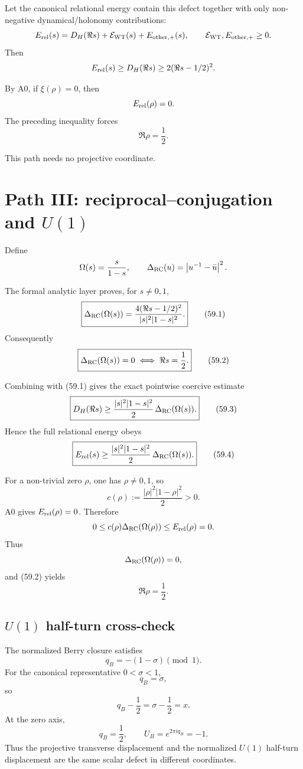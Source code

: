 Let the canonical relational energy contain this defect together with only
non-negative dynamical/holonomy contributions:
\[
E_{\rm rel}(s)
=
D_H(\Re s)
+
\mathcal E_{\rm WT}(s)
+
E_{\rm other,+}(s),
\qquad
\mathcal E_{\rm WT},E_{\rm other,+}\ge0.
\]
Then
\[
E_{\rm rel}(s)\ge D_H(\Re s)\ge2(\Re s-1/2)^2.
\]

By A0, if \(\xi(\rho)=0\), then
\[
E_{\rm rel}(\rho)=0.
\]
The preceding inequality forces
\[
\boxed{\Re\rho=\frac12.}
\]

This path needs no projective coordinate.

\section{Path III: reciprocal--conjugation and \(U(1)\)}

Define
\[
\Omega(s)=\frac{s}{1-s},
\qquad
\Delta_{\rm RC}(u)
=
\left|u^{-1}-\bar u\right|^2.
\]

The formal analytic layer proves, for \(s\ne0,1\),
\[
\boxed{
\Delta_{\rm RC}(\Omega(s))
=
\frac{4(\Re s-1/2)^2}
{|s|^2|1-s|^2}.
}
\tag{59.1}
\]
Consequently
\[
\boxed{
\Delta_{\rm RC}(\Omega(s))=0
\iff
\Re s=\frac12.
}
\tag{59.2}
\]

Combining  with (59.1) gives the exact pointwise
coercive estimate
\[
\boxed{
D_H(\Re s)
\ge
\frac{|s|^2|1-s|^2}{2}\,
\Delta_{\rm RC}(\Omega(s)).
}
\tag{59.3}
\]
Hence the full relational energy obeys
\[
\boxed{
E_{\rm rel}(s)
\ge
\frac{|s|^2|1-s|^2}{2}\,
\Delta_{\rm RC}(\Omega(s)).
}
\tag{59.4}
\]

For a non-trivial zero \(\rho\), one has \(\rho\ne0,1\), so
\[
c(\rho):=
\frac{|\rho|^2|1-\rho|^2}{2}
>0.
\]
A0 gives \(E_{\rm rel}(\rho)=0\).  Therefore
\[
0
\le
c(\rho)\Delta_{\rm RC}(\Omega(\rho))
\le
E_{\rm rel}(\rho)
=
0.
\]
Thus
\[
\Delta_{\rm RC}(\Omega(\rho))=0,
\]
and (59.2) yields
\[
\boxed{\Re\rho=\frac12.}
\]

\subsection{\(U(1)\) half-turn cross-check}

The normalized Berry closure satisfies
\[
q_B=-(1-\sigma)\pmod1.
\]
For the canonical representative \(0<\sigma<1\),
\[
q_B=\sigma,
\]
so
\[
q_B-\frac12
=
\sigma-\frac12
=
x.
\]
At the zero axis,
\[
q_B=\frac12,
\qquad
U_B=e^{2\pi iq_B}=-1.
\]
Thus the projective transverse displacement and the normalized \(U(1)\)
half-turn displacement are the same scalar defect in different coordinates.

